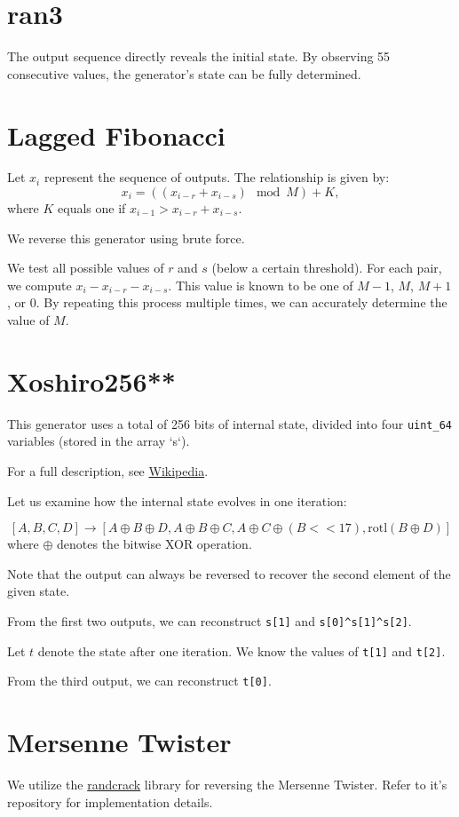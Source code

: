 \documentclass[12pt, a4paper]{report}
\begin{document}
\section{ran3}
The output sequence directly reveals the initial state. By observing 55 consecutive values,
the generator's state can be fully determined.

\section{Lagged Fibonacci}
Let $x_i$ represent the sequence of outputs. The relationship is given by:
$$x_{i} = ((x_{i-r} + x_{i-s}) \mod M) + K,$$ 
where $K$ equals one if $x_{i-1} > x_{i-r} + x_{i-s}$.

We reverse this generator using brute force.

We test all possible values of $r$ and $s$ (below a certain threshold). For each pair,
we compute $x_{i} - x_{i-r} - x_{i-s}$. This value is known to be one of $M-1$, $M$, $M+1$,
or $0$. By repeating this process multiple times, we can accurately determine the value of $M$.

\section{Xoshiro256**}
This generator uses a total of 256 bits of internal state, divided into four \verb|uint_64|
variables (stored in the array `s`).

For a full description, see \href{https://en.m.wikipedia.org/wiki/Xorshift#xoshiro256**}{Wikipedia}.

Let us examine how the internal state evolves in one iteration:

$$[A, B, C, D] \to [A\oplus B\oplus D, A\oplus B \oplus C, A\oplus C\oplus (B<<17), \text{rotl}(B\oplus D)]$$
where $\oplus$ denotes the bitwise XOR operation.

Note that the output can always be reversed to recover the second element of the given state.

From the first two outputs, we can reconstruct \verb|s[1]| and \verb|s[0]^s[1]^s[2]|.

Let $t$ denote the state after one iteration. We know the values of \verb|t[1]| and \verb|t[2]|.

From the third output, we can reconstruct \verb|t[0]|.

\section{Mersenne Twister}
We utilize the \href{https://github.com/tna0y/Python-random-module-cracker}{randcrack}
library for reversing the Mersenne Twister. Refer to it's repository for implementation details.
\end{document}

